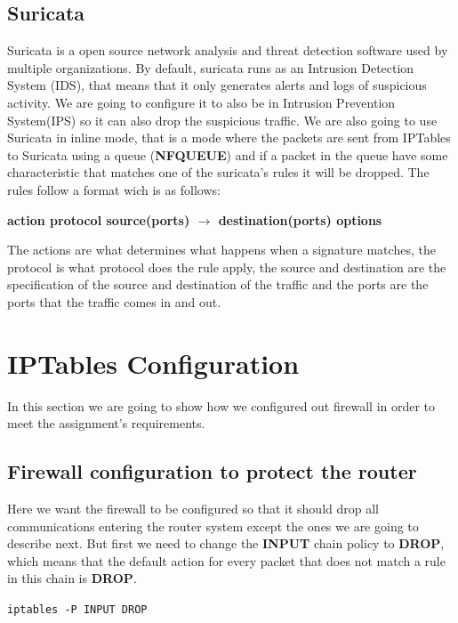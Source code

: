 \documentclass{article}
\begin{document}
\subsection{Suricata}
\label{subsec:suricata}
\texttt{}\par
Suricata is a open source network analysis and threat detection software used by multiple organizations. By default, suricata runs as an Intrusion Detection System (IDS), that means that it only generates alerts and logs of suspicious activity. We are going to configure it to also be in Intrusion Prevention System(IPS) so it can also drop the suspicious traffic. We are also going to use Suricata in inline mode, that is a mode where the packets are sent from IPTables to Suricata using a queue (\textbf{NFQUEUE}) and if a packet in the queue have some characteristic that matches one of the suricata's rules it will be dropped. The rules follow a format wich is as follows:\par
\begin{center}
\textbf{action protocol source(ports) $\rightarrow$ destination(ports) options}
\end{center} \par
The actions are what determines what happens when a signature matches, the protocol is what protocol does the rule apply, the source and destination are the specification of the source and destination of the traffic and the ports are the ports that the traffic comes in and out.
    


\section{IPTables Configuration}
\texttt{}\par In this section we are going to show how we configured out firewall in order to meet the assignment's requirements.

\subsection{Firewall configuration to protect the router}
\texttt{}\par Here we want the firewall to be configured so that it should drop all communications entering the router system except the ones we are going to describe next. But first we need to change the \textbf{INPUT} chain policy to \textbf{DROP}, which means that the default action for every packet that does not match a rule in this chain is \textbf{DROP}. \par
\texttt{}\par
\texttt{iptables -P INPUT DROP}
\end{document}
